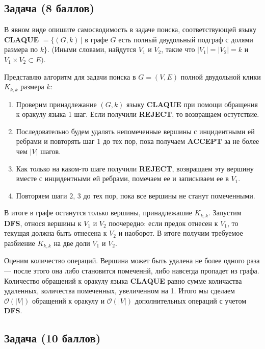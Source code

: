 \subsection{Задача \textbf{(8 баллов)}}

В явном виде опишите самосводимость в задаче поиска, соответствующей языку \textbf{CLAQUE} $= \{(G, k) \, |$ в графе $G$ есть полный двудольный подграф с долями размера по $k\}$. (Иными словами, найдутся $V_1$ и $V_2$, такие что $|V_1| = |V_2| = k$ и $V_1 \times V_2 \subset E)$.

\begin{solution}
    Представлю алгоритм для задачи поиска в $G = (V, E)$ полной двудольной клики $K_{k, k}$ размера $k$:
    \begin{enumerate}
        \item Проверим принадлежание $(G, k)$ языку \textbf{CLAQUE} при помощи обращения к оракулу языка 1 шаг. Если получили \textbf{REJECT}, то возвращаем остутствие.
        \item Последовательно будем удалять непомеченные вершины с инцидентными ей ребрами и повторять шаг $1$ до тех пор, пока получаем \textbf{ACCEPT} за не более чем $|V|$ шагов.
        \item Как только на каком-то шаге получили \textbf{REJECT}, возвращаем эту вершину вместе с инцидентными ей ребрами, помечаем ее и записываем ее в $V_1$.
        \item Повторяем шаги $2$, $3$ до тех пор, пока все вершины не станут помеченными.
    \end{enumerate}
    В итоге в графе останутся только вершины, принадлежашие $K_{k, k}$. Запустим \textbf{DFS}, относя вершины к $V_1$ и $V_2$ поочередно: если предок отнесен к $V_1$, то текущая должна быть отнесена к $V_2$ и наоборот.
    В итоге получим требуемое разбиение $K_{k, k}$ на две доли $V_1$ и $V_2$.

    Оценим количество операций. Вершина может быть удалена не более одного раза --- после этого она либо становится помеченнй, либо навсегда пропадет из графа.
    Количество обращений к оракулу языка \textbf{CLAQUE} равно сумме количаства удаленных, количества помеченных, увеличенном на 1.
    Итого мы сделаем $\mathcal{O}(|V|)$ обращений к оракулу и $\mathcal{O}(|V|)$ дополнительных операций с учетом \textbf{DFS}.
\end{solution}


\subsection{Задача \textbf{(10 баллов)}}

